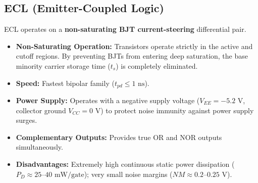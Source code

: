 \documentclass[12pt,a4paper]{article}
\begin{document}
\subsection{ECL (Emitter-Coupled Logic)}
ECL operates on a \textbf{non-saturating BJT current-steering} differential pair.
\begin{itemize}[leftmargin=*, itemsep=3pt]
  \item \textbf{Non-Saturating Operation:} Transistors operate strictly in the active and cutoff regions. By preventing BJTs from entering deep saturation, the base minority carrier storage time ($t_s$) is completely eliminated.
  \item \textbf{Speed:} Fastest bipolar family ($t_{pd} \le 1\text{ ns}$).
  \item \textbf{Power Supply:} Operates with a negative supply voltage ($V_{EE} = -5.2\text{ V}$, collector ground $V_{CC} = 0\text{ V}$) to protect noise immunity against power supply surges.
  \item \textbf{Complementary Outputs:} Provides true OR and NOR outputs simultaneously.
  \item \textbf{Disadvantages:} Extremely high continuous static power dissipation ($P_D \approx 25\text{--}40\text{ mW/gate}$); very small noise margins ($NM \approx 0.2\text{--}0.25\text{ V}$).
\end{itemize}
\end{document}
